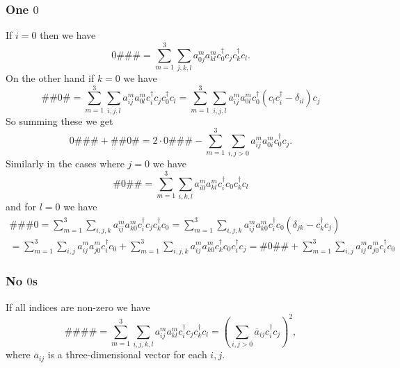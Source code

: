 \documentclass[a4paper,11pt]{article}
\numberwithin{equation}{section}
\begin{document}
\subsubsection*{One $ 0 $}
If $ i=0 $ then we have \begin{equation}
0\#\#\#=\sum_{m=1}^{3}\sum_{j,k,l}a^m_{0j}a^m_{kl}c_0^\dagger c_jc_k^\dagger c_l.
\end{equation} 
On the other hand if $ k=0 $ we have \begin{equation}
\#\#0\#=\sum_{m=1}^{3}\sum_{i,j,l}a^m_{ij}a^m_{0l}c_i^\dagger c_jc_0^\dagger c_l=\sum_{m=1}^{3}\sum_{i,j,l}a^m_{ij}a^m_{0l}c_0^\dagger(c_lc_i^\dagger-\delta_{il}) c_j
\end{equation}
So summing these we get\begin{equation}
0\#\#\#+\#\#0\#=2\cdot 0\#\#\#-\sum_{m=1}^{3}\sum_{i,j>0} a^m_{ij}a_{0i}^mc_0^\dagger c_j.
\end{equation}
Similarly in the cases where $ j=0 $ we have \begin{equation}
\#0\#\#=\sum_{m=1}^{3}\sum_{i,k,l}a^m_{i0}a^m_{kl}c_i^\dagger c_0c_k^\dagger c_l
\end{equation}
and for $ l=0 $ we have \begin{equation}
\begin{aligned}
\#\#\#0=\sum_{m=1}^{3}\sum_{i,j,k}a^m_{ij}a^m_{k0}c_i^\dagger c_jc_k^\dagger c_0=\sum_{m=1}^{3}\sum_{i,j,k}a^m_{ij}a^m_{k0}c_i^\dagger  c_0(\delta_{jk}-c_k^\dagger c_j)\\=\sum_{m=1}^{3}\sum_{i,j}a^m_{ij}a^m_{j0}c_i^\dagger  c_0+\sum_{m=1}^{3}\sum_{i,j,k}a^m_{ij}a^m_{k0} c_k^\dagger c_0 c_i^\dagger  c_j=\#0\#\#+\sum_{m=1}^{3}\sum_{i,j}a^m_{ij}a^m_{j0}c_i^\dagger  c_0
\end{aligned}
\end{equation}
\subsubsection*{No $ 0 $s}
If all indices are non-zero we have \begin{equation}
\#\#\#\#=\sum_{m=1}^{3}\sum_{i,j,k,l}a^m_{ij}a^m_{kl}c_i^\dagger c_jc_k^\dagger c_l=\left(\sum_{i,j>0}\overline{a}_{ij}c_i^\dagger c_j\right)^2,
\end{equation}
where $ \overline{a}_{ij} $ is a three-dimensional vector for each $ i,j $.
\end{document}
